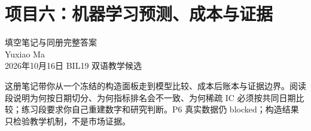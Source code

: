 \documentclass[cjk]{loom}
\begin{document}
\color{inkiron}
\section*{项目六：机器学习预测、成本与证据}
\begin{center}
{\Large 填空笔记与同册完整答案}\\[0.7em]
{\large Yuxiao Ma}\\[0.3em]
2026年10月16日 \quad BIL19 双语教学候选
\end{center}
\begin{strand}
这册笔记带你从一个冻结的构造面板走到模型比较、成本后账本与证据边界。阅读段说明为何按日期切分、为何指标排名会不一致、为何稀疏 IC 必须按共同日期比较；练习段要求你自己重建数字和研究判断。P6 真实数据仍 blocked；构造结果只检验教学机制，不是市场证据。
\end{strand}

\end{document}
